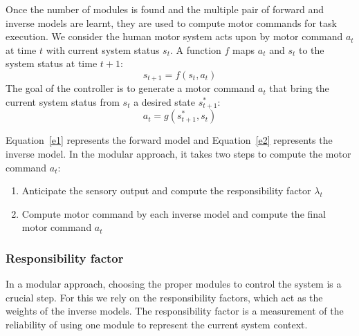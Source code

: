 Once the number of modules is found and the multiple pair of forward and inverse models are learnt, they are used to compute motor commands for task execution.
We consider the human motor system acts upon by motor command $a_t$ at time $t$ with current system status $s_t$. A function $f$ maps $a_t$ and $s_t$ to the  system status at time $t+1$:
\begin{equation}
\label{e1}
s_{t+1} = f\left(s_t,a_t\right)
\end{equation}
The goal of the controller is to generate a motor command $a_t$ that bring the current system status from $s_t$ a desired state $s^*_{t+1}$:
\begin{equation}
\label{e2}
a_t = g\left({s^*_{t+1},s_t}\right)
\end{equation}

Equation~\ref{e1} represents the forward model and Equation~\ref{e2} represents the inverse model. In the modular approach, it takes two steps to compute the motor command $a_t$:
\begin{enumerate}
\item Anticipate the sensory output and compute the responsibility factor $\lambda_t$
\item Compute motor command by each inverse model and compute the final motor command $a_t$
\end{enumerate}


%

\subsubsection{Responsibility factor}
\label{sec:rf}

In a modular approach, choosing the proper modules to control the system is a crucial step. For this we rely on the responsibility factors, which act as the weights of the inverse models. The responsibility factor is a measurement of the reliability of using one module to represent the current system context.

